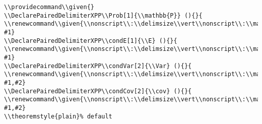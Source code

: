 \documentclass[c]{article}
\DeclareMathOperator{\Var}{Var}
\DeclareMathOperator{\cov}{Cov}
\DeclareMathOperator{\E}{\mathbb{E}}
\providecommand\given{}
\renewcommand\given{\nonscript\:\delimsize\vert\nonscript\:\mathopen{}}
\renewcommand\given{\nonscript\:\delimsize\vert\nonscript\:\mathopen{}}
\renewcommand\given{\nonscript\:\delimsize\vert\nonscript\:\mathopen{}}
\renewcommand\given{\nonscript\:\delimsize\vert\nonscript\:\mathopen{}}
\theoremstyle{plain}%
\theoremstyle{definition}
\theoremstyle{remark}
\begin{document}
\begin{verbatim}
\\providecommand\\given{}
\\DeclarePairedDelimiterXPP\\Prob[1]{\\mathbb{P}} (){}{
\\renewcommand\\given{\\nonscript\\:\\delimsize\\vert\\nonscript\\:\\mathopen{}}
#1}
\\DeclarePairedDelimiterXPP\\condE[1]{\\E} (){}{
\\renewcommand\\given{\\nonscript\\:\\delimsize\\vert\\nonscript\\:\\mathopen{}}
#1}
\\DeclarePairedDelimiterXPP\\condVar[2]{\\Var} (){}{
\\renewcommand\\given{\\nonscript\\:\\delimsize\\vert\\nonscript\\:\\mathopen{}}
#1,#2}
\\DeclarePairedDelimiterXPP\\condCov[2]{\\cov} (){}{
\\renewcommand\\given{\\nonscript\\:\\delimsize\\vert\\nonscript\\:\\mathopen{}}
#1,#2}
\\theoremstyle{plain}% default

\end{verbatim}
\end{document}
